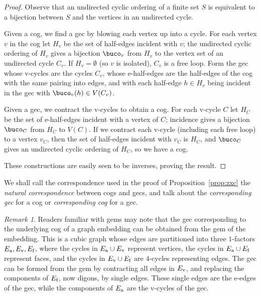 \documentclass{amsart}
\def\ea{E_{\textup{a}}}
\def\ev{E_{\textup{v}}}
\def\ef{E_{\textup{f}}}
\theoremstyle{definition}
\theoremstyle{remark}
\newtheorem{remark}[theorem]{Remark}
\numberwithin{equation}{section}
\begin{document}
\begin{proof}

Observe that an undirected cyclic ordering of a finite set $S$ is equivalent to a bijection between $S$ and the vertices in an undirected cycle.

Given a cog, we find a gec by blowing each vertex up into a cycle.  For each vertex $v$ in the cog let $H_v$ be the set of half-edges incident with $v$; the undirected cyclic ordering of $H_v$ gives a bijection $\buco_v$ from $H_v$ to the vertex set of an undirected cycle $C_v$.
If $H_v = \emptyset$ (so $v$ is isolated), $C_v$ is a free loop.
Form the gec whose v-cycles are the cycles $C_v$, whose e-half-edges are the half-edges of the cog with the same pairing into edges, and with each half-edge $h \in H_v$ being incident in the gec with $\buco_v(h) \in V(C_v)$.

Given a gec, we contract the v-cycles to obtain a cog.  For each v-cycle $C$ let $H_C$ be the set of e-half-edges incident with a vertex of $C$; incidence gives a bijection $\buco_C$ from $H_C$ to $V(C)$.  If we contract each v-cycle (including each free loop) to a vertex $v_C$, then the set of half-edges incident with $v_C$ is $H_C$, and $\buco_C$ gives an undirected cyclic ordering of $H_C$, so we have a cog.

These constructions are easily seen to be inverses, proving the result.
\end{proof}

We shall call the correspondence used in the proof of Proposition~\ref{prop:zxc} the \emph{natural correspondence} between cogs and gecs, and talk about the \emph{corresponding gec} for a cog or \emph{corresponding cog} for a gec.

\begin{remark} Readers familiar with gems may note that the gec corresponding to the underlying cog of a graph embedding can be obtained from the gem of the embedding.  This is a cubic graph whose edges are partitioned into three $1$-factors $\ea, \ev, \ef$, where the cycles in $\ea \cup \ev$ represent vertices, the cycles in $\ea \cup \ef$ represent faces, and the cycles in $\ev \cup \ef$ are $4$-cycles representing edges.  The gec can be formed from the gem by contracting all edges in $\ev$, and replacing the components of $\ef$, now digons, by single edges. These single edges are the e-edges of the gec, while the components of $\ea$ are the v-cycles of the gec.
\end{remark}
\end{document}
